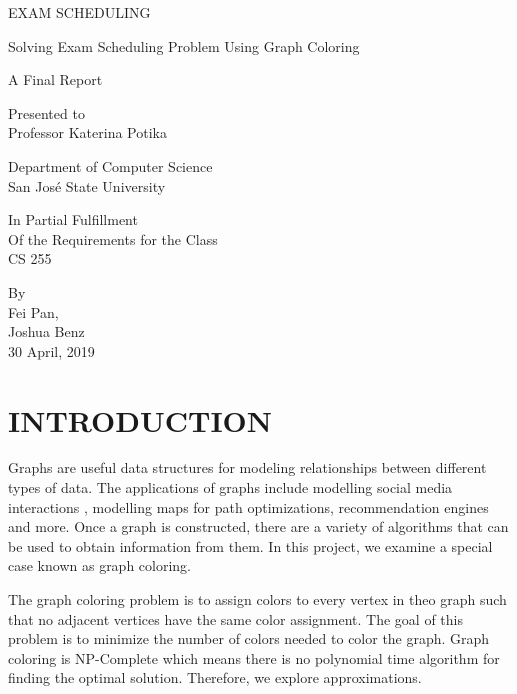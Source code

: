 \documentclass[12]{article}
\begin{document}
\begin{titlepage}


\setlength{\parindent}{0pt}
    \vspace*{-3.8\baselineskip}
    \MakeUppercase{{\tiny  Exam Scheduling}} \hfill 
    \begin{center}
    
    \vfill
     Solving Exam Scheduling Problem  Using Graph Coloring
\\
    \vfill
    
    A  Final Report\\
    \vfill
    
    Presented to  \\
    Professor Katerina Potika\\
    \vfill
    
    Department of Computer Science\\
    San Jos\'e State University\\
    \vfill
    
    In Partial Fulfillment\\
    Of the Requirements for the Class\\
    CS 255\\
    \vfill
    
    By\\ 
    Fei Pan,\\
    Joshua Benz\\
    30 April, 2019\\
\end{center}
\end{titlepage}

\tableofcontents
\thispagestyle{mypagestyle}
\clearpage
{}
\setcounter{page}{1}
\setlength{\parindent}{4em}
\renewcommand{\baselinestretch}{1.5}

\section{INTRODUCTION}
	Graphs are useful data structures for modeling relationships between different types of data. The applications of graphs include modelling social media interactions , modelling maps for path optimizations, recommendation engines and more. Once a graph is constructed, there are a variety of algorithms that can be used to obtain information from them. In this project, we examine a special case known as graph coloring.

The graph coloring problem is to assign colors to every vertex in theo graph such that no adjacent vertices have the same color assignment. The goal of this problem is to minimize the number of colors needed to color the graph. Graph coloring is NP-Complete which means there is no polynomial time algorithm for finding the optimal solution. Therefore, we explore approximations. 
\end{document}
